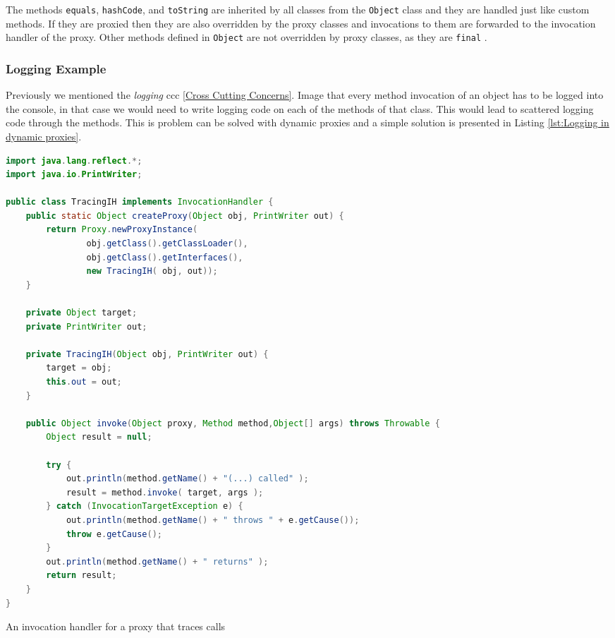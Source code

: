 The methods \texttt{equals}, \texttt{hashCode}, and \texttt{toString} are inherited by all classes from the \texttt{Object} class and they are handled just like custom methods.
If they are proxied then they are also overridden by the proxy classes and invocations to them are forwarded to the invocation handler of the proxy. 
Other methods defined in \texttt{Object} are not overridden by proxy classes, as they are \texttt{final} \cite{eugster2006uniform}.

\subsubsection{Logging Example}
Previously we mentioned the \textit{logging} \ac{ccc} \ref{Cross Cutting Concerns}.
Image that every method invocation of an object has to be logged into the console, in that case we would need to write logging code on each of the methods of that class.
This would lead to scattered logging code through the methods.
This is problem can be solved with dynamic proxies and a simple solution is presented in Listing \ref{lst:Logging in dynamic proxies}.

\begin{sourcecode}[H]
	\begin{lstlisting}[language=Java]
import java.lang.reflect.*;
import java.io.PrintWriter;

public class TracingIH implements InvocationHandler {
	public static Object createProxy(Object obj, PrintWriter out) {
		return Proxy.newProxyInstance(
				obj.getClass().getClassLoader(),
				obj.getClass().getInterfaces(),
				new TracingIH( obj, out));
	}

	private Object target;
	private PrintWriter out;

	private TracingIH(Object obj, PrintWriter out) {
		target = obj;
		this.out = out;
	}

	public Object invoke(Object proxy, Method method,Object[] args) throws Throwable {
		Object result = null;

		try {
			out.println(method.getName() + "(...) called" );
			result = method.invoke( target, args );
		} catch (InvocationTargetException e) {
			out.println(method.getName() + " throws " + e.getCause());
			throw e.getCause();
		}
		out.println(method.getName() + " returns" );
		return result;
	}
}
	\end{lstlisting}
	\caption{An invocation handler for a proxy that traces calls \cite{forman2004java}}
	\label{lst:Logging in dynamic proxies}
\end{sourcecode}

